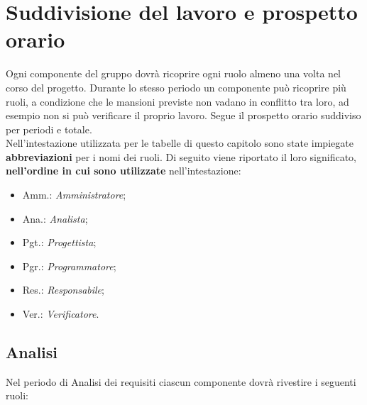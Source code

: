 \section{Suddivisione del lavoro e prospetto orario}
Ogni componente del gruppo dovrà ricoprire ogni ruolo almeno una volta nel corso del progetto.
Durante lo stesso periodo un componente può ricoprire più ruoli, a condizione che le mansioni previste non vadano in conflitto tra loro, ad esempio non si può verificare il proprio lavoro.
Segue il prospetto orario suddiviso per periodi e totale. \\

Nell'intestazione utilizzata per le tabelle di questo capitolo sono state impiegate \textbf{abbreviazioni} per i nomi dei ruoli.
Di seguito viene riportato il loro significato, \textbf{nell'ordine in cui sono utilizzate} nell'intestazione:
\begin{itemize}
\item Amm.: \textit{Amministratore};
\item Ana.: \textit{Analista};
\item Pgt.: \textit{Progettista};
\item Pgr.: \textit{Programmatore};
\item Res.: \textit{Responsabile};
\item Ver.: \textit{Verificatore}.
\end{itemize}

\pagebreak
\subsection{Analisi}
Nel periodo di Analisi dei requisiti ciascun componente dovrà rivestire i seguenti ruoli:

